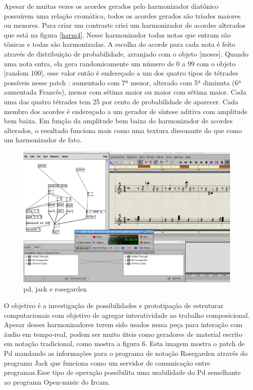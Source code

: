 \documentclass{ppgmus}
\begin{document}
Apesar de muitas vezes os acordes gerados pelo harmonizador diatônico possuírem uma relação 
cromática, todos os acordes gerados são tríades maiores ou menores. Para criar um contraste 
criei um harmonizador de acordes alterados que está na figura \ref{harm4}. Nesse harmonizador todas notas 
que entram são tônicas e todas são harmonizadas. 
	A escolha do acorde para cada nota é feito através de distribuição de probabilidade, 
arranjado com o objeto [moses]. Quando uma nota entra, ela gera randomicamente um número de 0 
a 99 com o objeto [random 100], esse valor então é endereçado a um dos quatro tipos de tétrades 
possíveis nesse patch : aumentado com 7ª menor, alterado com 5ª diminuta (6ª aumentada Francês), 
menor com sétima maior ou maior com sétima maior. Cada uma das quatro tétrades tem 25 por cento 
de probabilidade de aparecer. Cada membro dos acordes é endereçado a um gerador de síntese aditiva 
com amplitude bem baixa. Em função da amplitude bem baixa do harmonizador de acordes alterados, o 
resultado funciona mais como uma textura dissonante do que como um harmonizador de fato.



\begin{figure}[!ht]
\includegraphics[scale=.4]{harm5}
\caption{pd, jack e rosegarden}
\label{harm5}
\end{figure}

O objetivo é a investigação de possibilidades e prototipação de estruturas computacionais com 
objetivo de agregar interatividade ao trabalho composicional.  
	Apesar desses harmonizadores terem sido usados nessa peça para interação com áudio em 
tempo-real, podem ser muito úteis como geradores de material escrito em notação tradicional, 
como mostra a figura 6. Esta imagem mostra o patch de Pd mandando as informações para o programa 
de notação Rosegarden através do programa Jack que funciona como um servidor de comunicação entre 
programas.Esse tipo de operação possibilita uma usabilidade do Pd semelhante ao programa Open-music 
do Ircam.
\end{document}
